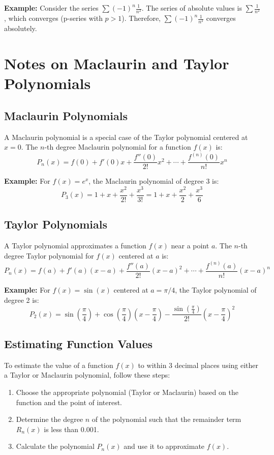 \documentclass{article}
\begin{document}
\textbf{Example:}
Consider the series \(\sum (-1)^n \frac{1}{n^2}\). The series of absolute values is \(\sum \frac{1}{n^2}\), which converges (p-series with \(p > 1\)). Therefore, \(\sum (-1)^n \frac{1}{n^2}\) converges absolutely.

\section*{Notes on Maclaurin and Taylor Polynomials}

\subsection*{Maclaurin Polynomials}
A Maclaurin polynomial is a special case of the Taylor polynomial centered at \(x = 0\). The \(n\)-th degree Maclaurin polynomial for a function \(f(x)\) is:
\[ P_n(x) = f(0) + f'(0)x + \frac{f''(0)}{2!}x^2 + \cdots + \frac{f^{(n)}(0)}{n!}x^n \]

\textbf{Example:}
For \(f(x) = e^x\), the Maclaurin polynomial of degree 3 is:
\[ P_3(x) = 1 + x + \frac{x^2}{2!} + \frac{x^3}{3!} = 1 + x + \frac{x^2}{2} + \frac{x^3}{6} \]

\subsection*{Taylor Polynomials}
A Taylor polynomial approximates a function \(f(x)\) near a point \(a\). The \(n\)-th degree Taylor polynomial for \(f(x)\) centered at \(a\) is:
\[ P_n(x) = f(a) + f'(a)(x-a) + \frac{f''(a)}{2!}(x-a)^2 + \cdots + \frac{f^{(n)}(a)}{n!}(x-a)^n \]

\textbf{Example:}
For \(f(x) = \sin(x)\) centered at \(a = \pi/4\), the Taylor polynomial of degree 2 is:
\[ P_2(x) = \sin\left(\frac{\pi}{4}\right) + \cos\left(\frac{\pi}{4}\right)(x - \frac{\pi}{4}) - \frac{\sin\left(\frac{\pi}{4}\right)}{2!}(x - \frac{\pi}{4})^2 \]

\subsection*{Estimating Function Values}
To estimate the value of a function \(f(x)\) to within 3 decimal places using either a Taylor or Maclaurin polynomial, follow these steps:
\begin{enumerate}
    \item Choose the appropriate polynomial (Taylor or Maclaurin) based on the function and the point of interest.
    \item Determine the degree \(n\) of the polynomial such that the remainder term \(R_n(x)\) is less than 0.001.
    \item Calculate the polynomial \(P_n(x)\) and use it to approximate \(f(x)\).
\end{enumerate}
\end{document}
